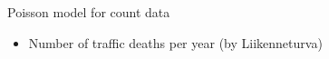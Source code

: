 \documentclass[english,t]{beamer}
\begin{document}
\begin{frame}{Poisson model for count data}

  \begin{itemize}
  \item Number of traffic deaths per year (by Liikenneturva)
  \end{itemize}

  \vspace{\baselineskip}
  

\end{frame}
\end{document}
